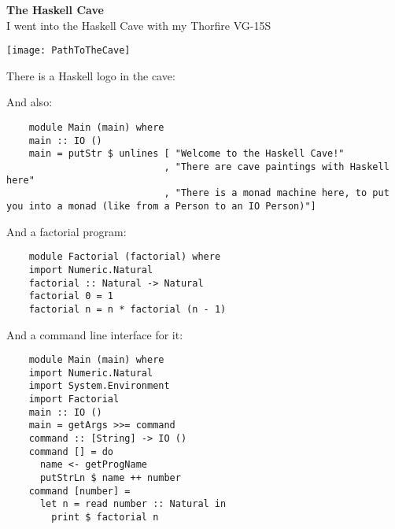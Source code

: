 \documentclass[UTF8]{tufte-book}
\newenvironment{entry}[2] %
{\noindent\textbf{#2}\marginnote{#1}\\}{\vspace{0.5cm}}
\begin{document}
\begin{entry}{2020-07-12}{The Haskell Cave}
  I went into the Haskell Cave with my Thorfire VG-15S

  \texttt{[image: PathToTheCave]}

  There is a Haskell logo \haskelllogo[scale=.125] in the cave:

  \haskelllogo

  And also:
  \begin{verbatim}
    module Main (main) where
    main :: IO ()
    main = putStr $ unlines [ "Welcome to the Haskell Cave!"
                            , "There are cave paintings with Haskell here"
                            , "There is a monad machine here, to put you into a monad (like from a Person to an IO Person)"]
  \end{verbatim}
  And a factorial program:
  \begin{verbatim}
    module Factorial (factorial) where
    import Numeric.Natural
    factorial :: Natural -> Natural
    factorial 0 = 1
    factorial n = n * factorial (n - 1)
  \end{verbatim}
  And a command line interface for it:
  \begin{verbatim}
    module Main (main) where
    import Numeric.Natural
    import System.Environment
    import Factorial
    main :: IO ()
    main = getArgs >>= command
    command :: [String] -> IO ()
    command [] = do
      name <- getProgName
      putStrLn $ name ++ number
    command [number] =
      let n = read number :: Natural in
        print $ factorial n
  \end{verbatim}
\end{entry}
\end{document}
